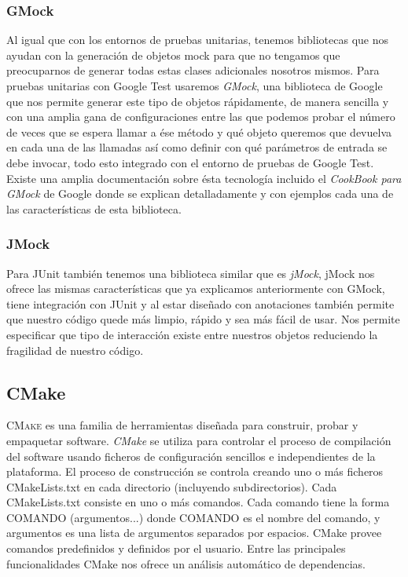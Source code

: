\documentclass[12pt,a4paper,spanish]{book} %
\begin{document}
\subsubsection{GMock}

Al igual que con los entornos de pruebas unitarias, tenemos bibliotecas que nos ayudan con la generación de objetos mock para que no tengamos que preocuparnos de generar todas estas clases adicionales nosotros mismos. Para pruebas unitarias con Google Test usaremos \emph{GMock}, una biblioteca de Google que nos permite generar este tipo de objetos rápidamente, de manera sencilla y con una amplia gana de configuraciones entre las que podemos probar el número de veces que se espera llamar a ése método y qué objeto queremos que devuelva en cada una de las llamadas así como definir con qué parámetros de entrada se debe invocar, todo esto integrado con el entorno de pruebas de Google Test. Existe una amplia documentación sobre ésta tecnología incluido el \emph{CookBook para GMock} de Google donde se explican detalladamente y con ejemplos cada una de las características de esta biblioteca.


\subsubsection{JMock}

Para JUnit también tenemos una biblioteca similar que es \emph{jMock}, jMock nos ofrece las mismas características que ya explicamos anteriormente con GMock, tiene integración con JUnit y al estar diseñado con anotaciones también permite que nuestro código quede más limpio, rápido y sea más fácil de usar. Nos permite especificar que tipo de interacción existe entre nuestros objetos reduciendo la fragilidad de nuestro código.

\subsection{CMake}

\lettrine{C}{Make} es una familia de herramientas diseñada para construir, probar y empaquetar software. \emph{CMake} se utiliza para controlar el proceso de compilación del software usando ficheros de configuración sencillos e independientes de la plataforma. El proceso de construcción se controla creando uno o más ficheros CMakeLists.txt en cada directorio (incluyendo subdirectorios). Cada CMakeLists.txt consiste en uno o más comandos. Cada comando tiene la forma COMANDO (argumentos...) donde COMANDO es el nombre del comando, y argumentos es una lista de argumentos separados por espacios. CMake provee comandos predefinidos y definidos por el usuario. Entre las principales funcionalidades CMake nos ofrece un análisis automático de dependencias. 
\end{document}
